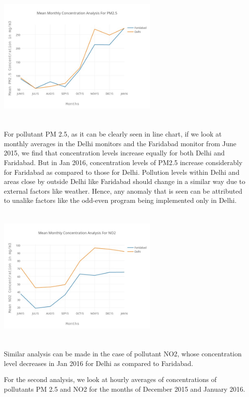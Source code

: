 \documentclass{report}
\begin{document}
\graphicspath{ {report/} }
\includegraphics[width=8cm, height=7cm]{monthly_PM25}

For pollutant PM 2.5, as it can be clearly seen in line chart, if we look at monthly averages in the Delhi monitors and the Faridabad monitor from June 2015, we find that concentration levels increase equally for both Delhi and Faridabad. But in Jan 2016, concentration levels of PM2.5 increase considerably for Faridabad as compared to those for Delhi. Pollution levels within Delhi and areas close by outside Delhi like Faridabad should change in a similar way due to external factors like weather. Hence, any anomaly that is seen can be attributed to unalike factors like the odd-even program being implemented only in Delhi. 

\graphicspath{ {report/} }
\includegraphics[width=8cm, height=7cm]{monthly_NO2}

Similar analysis can be made in the case of pollutant NO2, whose concentration level decreases in Jan 2016 for Delhi as compared to Faridabad. 

For the second analysis, we look at hourly averages of concentrations of pollutants PM 2.5 and NO2 for the months of December 2015 and January 2016.
\end{document}
